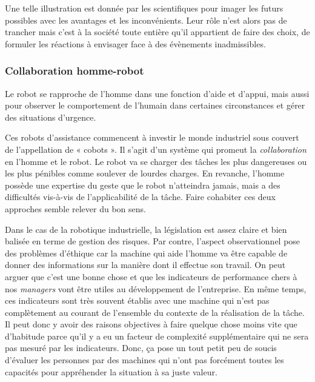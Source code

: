 Une telle illustration est donnée par les scientifiques pour imager les futurs possibles avec les avantages et les inconvénients. Leur rôle n'est alors pas de trancher mais c'est à la société toute entière qu'il appartient de faire des choix, de formuler les réactions à envisager face à des évènements inadmissibles.

\subsubsection[Collaboration homme-robot]{Collaboration homme-robot}
\label{subsub:III.3.1.2}

Le robot se rapproche de l'homme dans une fonction d'aide et d'appui, mais aussi pour observer le comportement de l'humain dans certaines circonstances et gérer des situations d'urgence.

Ces robots d'assistance commencent à investir le monde industriel sous couvert de l'appellation de « cobots ». Il s'agit d'un système qui promeut la \emph{collaboration} en l'homme et le robot. Le robot va se charger des tâches les plus dangereuses ou les plus pénibles comme soulever de lourdes charges. En revanche, l'homme possède une expertise du geste que le robot n'atteindra jamais, mais a des difficultés vis-à-vis de l'applicabilité de la tâche. Faire cohabiter ces deux approches semble relever du bon sens.

Dans le cas de la robotique industrielle, la législation est assez claire et bien balisée en terme de gestion des risques. Par contre, l'aspect observationnel pose des problèmes d'éthique car la machine qui aide l'homme va être capable de donner des informations sur la manière dont il effectue son travail. On peut arguer que c'est une bonne chose et que les indicateurs de performance chers à nos \textit{managers} vont être utiles au développement de l'entreprise. 
En même temps, ces indicateurs sont très souvent établis avec une machine qui n'est pas complètement au courant de l'ensemble du contexte de la réalisation de la tâche. Il peut donc y avoir des raisons objectives à faire quelque chose moins vite que d'habitude parce qu'il y a eu un facteur de complexité supplémentaire qui ne sera pas mesuré par les indicateurs. Donc, ça pose un tout petit peu de soucis d'évaluer les personnes par des machines qui n'ont pas forcément toutes les capacités pour appréhender la situation à sa juste valeur. 


